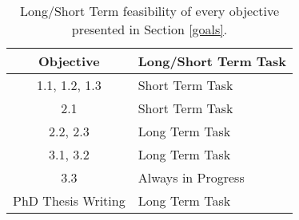 \begin{table}[h]
    \centering    
    \begin{tabular}{|c|p{5cm}|}
    \hline
    \textbf{Objective} & \textbf{Long/Short Term Task} \\ \hline
    1.1, 1.2, 1.3 & Short Term Task\\ \hline
    2.1 & Short Term Task\\ \hline
    2.2, 2.3 & Long Term Task \\ \hline
    3.1, 3.2 & Long Term Task \\ \hline
    3.3   & Always in Progress \\ \hline
    PhD Thesis Writing & Long Term Task \\ \hline
    \end{tabular}
    \caption{Long/Short Term feasibility of every objective presented in Section \ref{goals}. \label{tab:completed}}
 \end{table}


    

